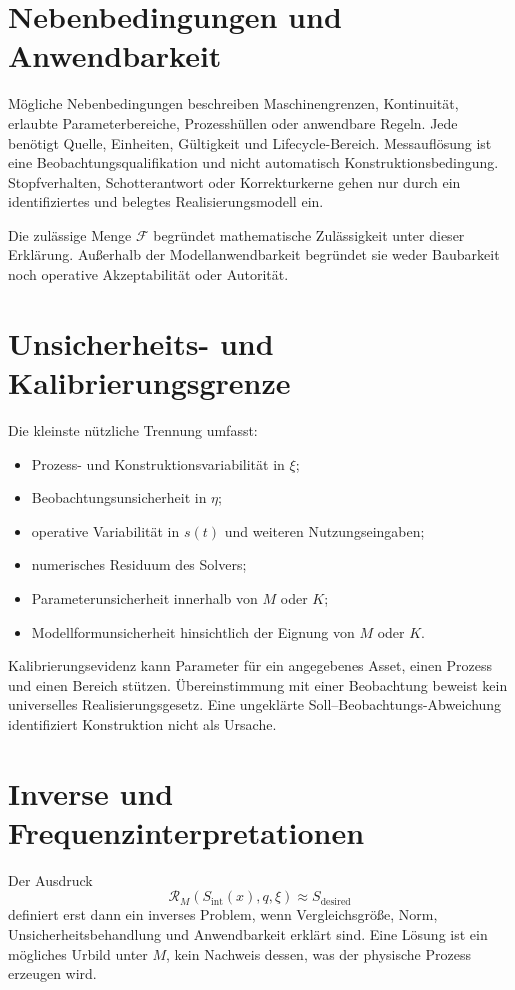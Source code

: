 \section{Nebenbedingungen und Anwendbarkeit}

Mögliche Nebenbedingungen beschreiben Maschinengrenzen, Kontinuität, erlaubte
Parameterbereiche, Prozesshüllen oder anwendbare Regeln. Jede benötigt Quelle,
Einheiten, Gültigkeit und Lifecycle-Bereich. Messauflösung ist eine
Beobachtungsqualifikation und nicht automatisch Konstruktionsbedingung.
Stopfverhalten, Schotterantwort oder Korrekturkerne gehen nur durch ein
identifiziertes und belegtes Realisierungsmodell ein.

Die zulässige Menge \(\mathcal F\) begründet mathematische Zulässigkeit unter
dieser Erklärung. Außerhalb der Modellanwendbarkeit begründet sie weder
Baubarkeit noch operative Akzeptabilität oder Autorität.

\section{Unsicherheits- und Kalibrierungsgrenze}

Die kleinste nützliche Trennung umfasst:
\begin{itemize}
\item Prozess- und Konstruktionsvariabilität in \(\xi\);
\item Beobachtungsunsicherheit in \(\eta\);
\item operative Variabilität in \(s(t)\) und weiteren Nutzungseingaben;
\item numerisches Residuum des Solvers;
\item Parameterunsicherheit innerhalb von \(M\) oder \(K\);
\item Modellformunsicherheit hinsichtlich der Eignung von \(M\) oder \(K\).
\end{itemize}

Kalibrierungsevidenz kann Parameter für ein angegebenes Asset, einen Prozess
und einen Bereich stützen. Übereinstimmung mit einer Beobachtung beweist kein
universelles Realisierungsgesetz. Eine ungeklärte Soll--Beobachtungs-Abweichung
identifiziert Konstruktion nicht als Ursache.

\section{Inverse und Frequenzinterpretationen}

Der Ausdruck
\[
\mathcal R_M(S_{\mathrm{int}}(x),q,\xi)
\approx S_{\mathrm{desired}}
\]
definiert erst dann ein inverses Problem, wenn Vergleichsgröße, Norm,
Unsicherheitsbehandlung und Anwendbarkeit erklärt sind. Eine Lösung ist ein
mögliches Urbild unter \(M\), kein Nachweis dessen, was der physische Prozess
erzeugen wird.

